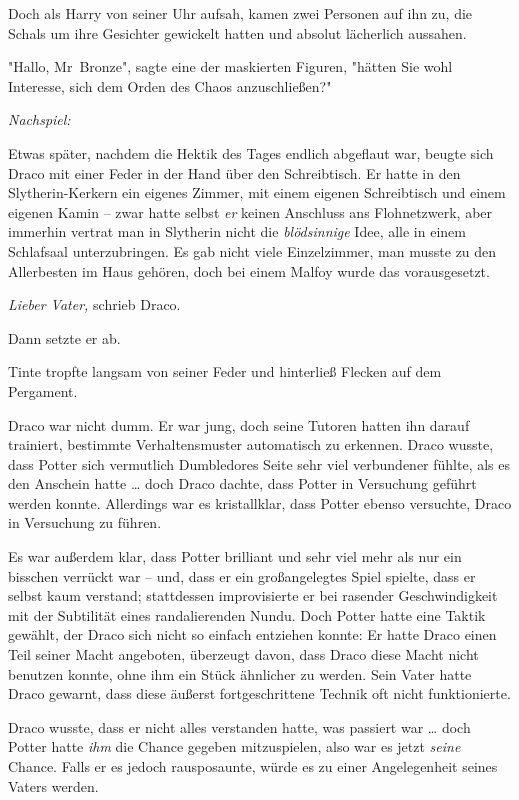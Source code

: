 {Doch als Harry von seiner Uhr aufsah, kamen zwei Personen auf ihn zu, die Schals um ihre Gesichter gewickelt hatten und absolut lächerlich aussahen.

"Hallo, Mr~Bronze", sagte eine der maskierten Figuren, "hätten Sie wohl Interesse, sich dem Orden des Chaos anzuschließen?"

\later

\emph{Nachspiel:}

Etwas später, nachdem die Hektik des Tages endlich abgeflaut war, beugte sich Draco mit einer Feder in der Hand über den Schreibtisch. Er hatte in den Slytherin-Kerkern ein eigenes Zimmer, mit einem eigenen Schreibtisch und einem eigenen Kamin -- zwar hatte selbst \emph{er} keinen Anschluss ans Flohnetzwerk, aber immerhin vertrat man in Slytherin nicht die \emph{blödsinnige} Idee, alle in einem Schlafsaal unterzubringen. Es gab nicht viele Einzelzimmer, man musste zu den Allerbesten im Haus gehören, doch bei einem Malfoy wurde das vorausgesetzt.

\emph{Lieber Vater,} schrieb Draco.

Dann setzte er ab.

Tinte tropfte langsam von seiner Feder und hinterließ Flecken auf dem Pergament.

Draco war nicht dumm. Er war jung, doch seine Tutoren hatten ihn darauf trainiert, bestimmte Verhaltensmuster automatisch zu erkennen. Draco wusste, dass Potter sich vermutlich Dumbledores Seite sehr viel verbundener fühlte, als es den Anschein hatte … doch Draco dachte, dass Potter in Versuchung geführt werden konnte. Allerdings war es kristallklar, dass Potter ebenso versuchte, Draco in Versuchung zu führen.

Es war außerdem klar, dass Potter brilliant und sehr viel mehr als nur ein bisschen verrückt war -- und, dass er ein großangelegtes Spiel spielte, dass er selbst kaum verstand; stattdessen improvisierte er bei rasender Geschwindigkeit mit der Subtilität eines randalierenden Nundu. Doch Potter hatte eine Taktik gewählt, der Draco sich nicht so einfach entziehen konnte: Er hatte Draco einen Teil seiner Macht angeboten, überzeugt davon, dass Draco diese Macht nicht benutzen konnte, ohne ihm ein Stück ähnlicher zu werden. Sein Vater hatte Draco gewarnt, dass diese äußerst fortgeschrittene Technik oft nicht funktionierte.

Draco wusste, dass er nicht alles verstanden hatte, was passiert war … doch Potter hatte \emph{ihm} die Chance gegeben mitzuspielen, also war es jetzt \emph{seine} Chance. Falls er es jedoch rausposaunte, würde es zu einer Angelegenheit seines Vaters werden.

}
